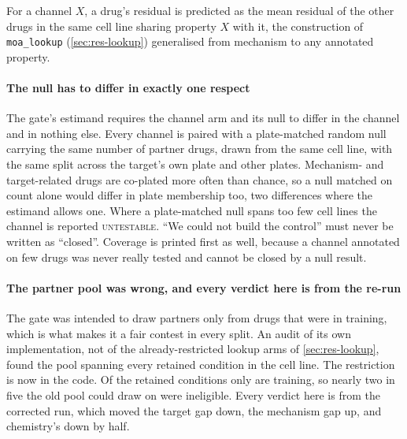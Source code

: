 \noindent
For a channel $X$, a drug's residual is predicted as the mean residual of the
other drugs in the same cell line sharing property $X$ with it, the construction
of \texttt{moa\_lookup} (\cref{sec:res-lookup}) generalised from mechanism to any
annotated property.

\paragraph{The null has to differ in exactly one respect} The gate's estimand
requires the channel arm and its null to differ in the channel and in nothing
else. Every channel is paired with a plate-matched random null carrying the same
number of partner drugs, drawn from the same cell line, with the same split
across the target's own plate and other plates. Mechanism- and target-related
drugs are co-plated more often than chance, so a null matched on count alone
would differ in plate membership too, two differences where the estimand allows
one. Where a plate-matched null spans too few cell lines the channel is reported
\textsc{untestable}. ``We could not build the control'' must never be written as
``closed''. Coverage is printed first as well, because a channel annotated on few
drugs was never really tested and cannot be closed by a null result.

\paragraph{The partner pool was wrong, and every verdict here is from the re-run}
The gate was intended to draw partners only from drugs that were in training,
which is what makes it a fair contest in every split. An audit of its own
implementation, not of the already-restricted lookup arms of
\cref{sec:res-lookup}, found the pool spanning every retained condition in the
cell line. The restriction is now in the code. Of the
 retained conditions only
 are training, so nearly two in five the old pool could
draw on were ineligible.
Every verdict here is from the corrected run, which moved the target gap down,
the mechanism gap up, and chemistry's down by half.

